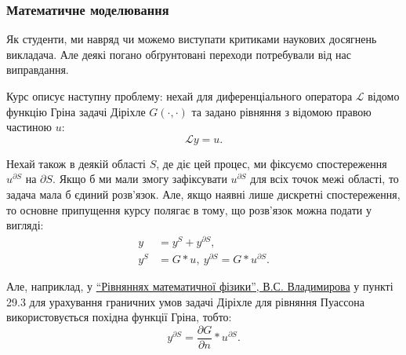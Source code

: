 \documentclass[14pt, a4paper]{extarticle}  %
\begin{document}


\subsubsection{Математичне моделювання}
Як студенти, ми навряд чи можемо виступати критиками наукових досягнень викладача. Але деякі погано обґрунтовані переходи потребували від нас виправдання. 

Курс описує наступну проблему: нехай для диференціального оператора $\mathcal{L}$ відомо функцію Гріна задачі Діріхле $G(\cdot, \cdot)$ та задано рівняння з відомою правою частиною $u$:
\[ \mathcal{L} y = u. \]

Нехай також в деякій області $S$, де діє цей процес, ми фіксуємо спостереження $u^{\partial S}$ на $\partial S$. Якщо б ми мали змогу зафіксувати $u^{\partial S}$ для всіх точок межі області, то задача мала б єдиний розв'язок. Але, якщо наявні лише дискретні спостереження, то основне припущення курсу полягає в тому, що розв'язок можна подати у вигляді:
\begin{align*}
   y &= y^S + y^{\partial S}, \\
   y^S &= G * u, \ y^{\partial S} = G * u^{\partial S}.
\end{align*}

Але, наприклад, у \href{http://cmcstuff.esyr.org/vmkbotva-r15/4\%20\%D0\%BA\%D1\%83\%D1\%80\%D1\%81/8\%20\%D0\%A1\%D0\%B5\%D0\%BC\%D0\%B5\%D1\%81\%D1\%82\%D1\%80/PDE\%20Extra\%20Chapters\%20\%5BHapaev\%20M.M.\%5D/\%D0\%92.\%D0\%A1.\%20\%D0\%92\%D0\%BB\%D0\%B0\%D0\%B4\%D0\%B8\%D0\%BC\%D0\%B8\%D1\%80\%D0\%BE\%D0\%B2.\%20\%D0\%A3\%D1\%80\%D0\%B0\%D0\%B2\%D0\%BD\%D0\%B5\%D0\%BD\%D0\%B8\%D1\%8F\%20\%D0\%BC\%D0\%B0\%D1\%82\%D0\%B5\%D0\%BC\%D0\%B0\%D1\%82\%D0\%B8\%D1\%87\%D0\%B5\%D1\%81\%D0\%BA\%D0\%BE\%D0\%B9\%20\%D1\%84\%D0\%B8\%D0\%B7\%D0\%B8\%D0\%BA\%D0\%B8.pdf}{``Рівняннях математичної фізики'', В.С. Владимирова} у пункті 29.3 для урахування граничних умов задачі Діріхле для рівняння Пуассона використовується похідна функції Гріна, тобто:
\[ y^{\partial S} = \frac{\partial G}{\partial n} * u^{\partial S}. \]
\end{document}
